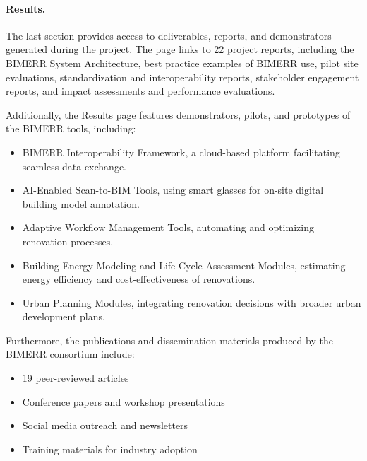 \paragraph*{Results.}
The last section provides access to deliverables, reports, and demonstrators generated during the project.
The page links to 22 project reports, including the BIMERR System Architecture, best practice examples of BIMERR use, pilot site evaluations, standardization and interoperability reports, stakeholder engagement reports, and impact assessments and performance evaluations.

Additionally, the Results page features demonstrators, pilots, and prototypes of the BIMERR tools, including:
\begin{itemize}
    \item BIMERR Interoperability Framework, a cloud-based platform facilitating seamless data exchange.
    \item AI-Enabled Scan-to-BIM Tools, using smart glasses for on-site digital building model annotation.
    \item Adaptive Workflow Management Tools, automating and optimizing renovation processes.
    \item Building Energy Modeling and Life Cycle Assessment Modules, estimating energy efficiency and cost-effectiveness of renovations.
    \item Urban Planning Modules, integrating renovation decisions with broader urban development plans.
\end{itemize}

Furthermore, the publications and dissemination materials produced by the BIMERR consortium include:
\begin{itemize}
    \item 19 peer-reviewed articles
    \item Conference papers and workshop presentations
    \item Social media outreach and newsletters
    \item Training materials for industry adoption
\end{itemize}
